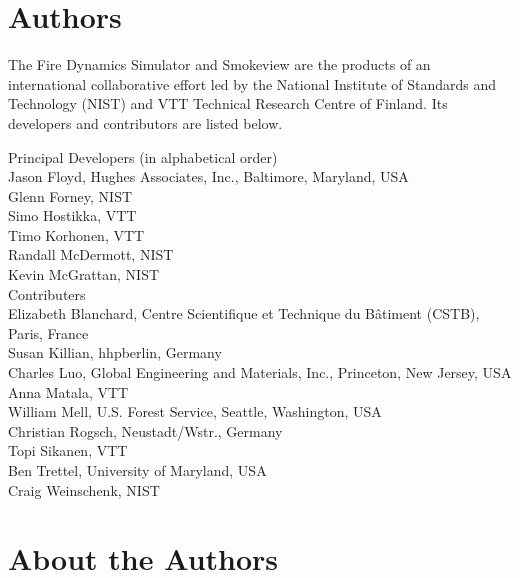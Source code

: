 \chapter{Authors}

The Fire Dynamics Simulator and Smokeview are the products of an international collaborative effort led by
the National Institute of Standards and Technology (NIST) and VTT Technical Research Centre of Finland. Its developers and
contributors are listed below.

\vspace{0.5in}

\begin{flushleft}

Principal Developers (in alphabetical order) \\ [0.2in]

Jason Floyd, Hughes Associates, Inc., Baltimore, Maryland, USA \\
Glenn Forney, NIST \\
Simo Hostikka, VTT \\
Timo Korhonen, VTT  \\
Randall McDermott, NIST \\
Kevin McGrattan, NIST \\ [0.5in]

Contributers \\ [0.2in]

Elizabeth Blanchard, Centre Scientifique et Technique du B\^{a}timent (CSTB), Paris, France \\
Susan Killian, hhpberlin, Germany \\
Charles Luo, Global Engineering and Materials, Inc., Princeton, New Jersey, USA \\
Anna Matala, VTT \\
William Mell, U.S. Forest Service, Seattle, Washington, USA \\
Christian Rogsch, Neustadt/Wstr., Germany \\
Topi Sikanen, VTT \\
Ben Trettel, University of Maryland, USA \\
Craig Weinschenk, NIST

\end{flushleft}


\chapter{About the Authors}


